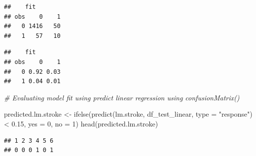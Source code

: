 \documentclass[
]{article}
\newenvironment{Shaded}{\begin{snugshade}}{\end{snugshade}}
\newcommand{\AttributeTok}[1]{\textcolor[rgb]{0.77,0.63,0.00}{#1}}
\newcommand{\CommentTok}[1]{\textcolor[rgb]{0.56,0.35,0.01}{\textit{#1}}}
\newcommand{\DecValTok}[1]{\textcolor[rgb]{0.00,0.00,0.81}{#1}}
\newcommand{\FloatTok}[1]{\textcolor[rgb]{0.00,0.00,0.81}{#1}}
\newcommand{\FunctionTok}[1]{\textcolor[rgb]{0.00,0.00,0.00}{#1}}
\newcommand{\NormalTok}[1]{#1}
\newcommand{\OtherTok}[1]{\textcolor[rgb]{0.56,0.35,0.01}{#1}}
\newcommand{\SpecialCharTok}[1]{\textcolor[rgb]{0.00,0.00,0.00}{#1}}
\newcommand{\StringTok}[1]{\textcolor[rgb]{0.31,0.60,0.02}{#1}}
\renewcommand{\=}[1]{\stackrel{#1}{=}}
\theoremstyle{definition}
\theoremstyle{remark}
\begin{document}
\begin{verbatim}
##    fit
## obs    0    1
##   0 1416   50
##   1   57   10
\end{verbatim}

\begin{Shaded}
\end{Shaded}

\begin{verbatim}
##    fit
## obs    0    1
##   0 0.92 0.03
##   1 0.04 0.01
\end{verbatim}

\begin{Shaded}
\begin{Highlighting}[]
\CommentTok{\# Evaluating model fit using predict linear regression using confusionMatrix()}

\NormalTok{predicted.lm.stroke }\OtherTok{\textless{}{-}} \FunctionTok{ifelse}\NormalTok{(}\FunctionTok{predict}\NormalTok{(lm.stroke, df\_test\_linear, }\AttributeTok{type =} \StringTok{"response"}\NormalTok{) }\SpecialCharTok{\textless{}} \FloatTok{0.15}\NormalTok{, }\AttributeTok{yes =} \DecValTok{0}\NormalTok{, }\AttributeTok{no =} \DecValTok{1}\NormalTok{)}
\FunctionTok{head}\NormalTok{(predicted.lm.stroke)}
\end{Highlighting}
\end{Shaded}

\begin{verbatim}
## 1 2 3 4 5 6 
## 0 0 0 1 0 1
\end{verbatim}

\begin{Shaded}
\end{Shaded}
\end{document}

